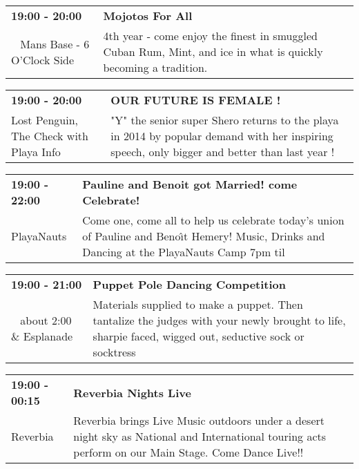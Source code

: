 \begin{tabular}{ p{1in} p{2.2in} }
    \textbf{19:00 - 20:00} & \textbf{Mojotos For All} \\
    ~ \newline Mans Base - 6 O'Clock Side & 4th year - come enjoy the finest in smuggled Cuban Rum, Mint, and ice in what is quickly becoming a tradition. \\
    \hline 
\end{tabular}
    
\begin{tabular}{ p{1in} p{2.2in} }
    \textbf{19:00 - 20:00} & \textbf{OUR FUTURE IS FEMALE !} \\
    Lost Penguin, The \newline Check with Playa Info & "Y" the senior super Shero returns to the playa in 2014 by popular demand with her inspiring speech, only bigger and better than last year ! \\
    \hline 
\end{tabular}
    
\begin{tabular}{ p{1in} p{2.2in} }
    \textbf{19:00 - 22:00} & \textbf{Pauline and Benoit got Married! come Celebrate!} \\
    PlayaNauts \newline  & Come one, come all to help us celebrate today's union of Pauline and Beno\^\i t Hemery! Music, Drinks and Dancing at the PlayaNauts Camp 7pm til \\
    \hline 
\end{tabular}
    
\begin{tabular}{ p{1in} p{2.2in} }
    \textbf{19:00 - 21:00} & \textbf{Puppet Pole Dancing Competition} \\
    ~ \newline about 2:00 \& Esplanade & Materials supplied to make a puppet. Then tantalize the judges with your newly brought to life, sharpie faced, wigged out, seductive sock or socktress \\
    \hline 
\end{tabular}
    
\begin{tabular}{ p{1in} p{2.2in} }
    \textbf{19:00 - 00:15} & \textbf{Reverbia Nights Live} \\
    Reverbia \newline  & Reverbia brings Live Music outdoors under a desert night sky as National and International touring acts perform on our Main Stage.  Come Dance Live!! \\
    \hline 
\end{tabular}
    
